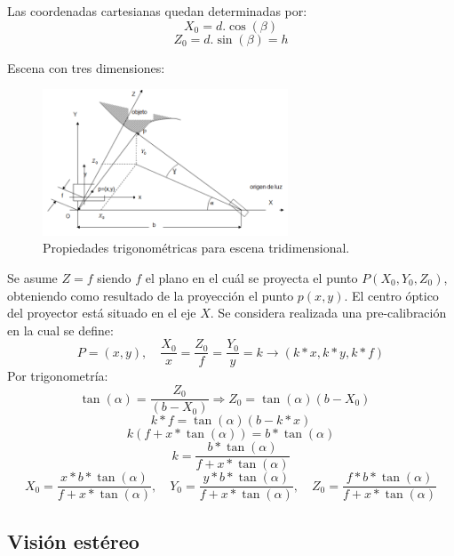 Las coordenadas cartesianas quedan determinadas por:
\[
X_0 = d. \cos (\beta)
\]
\[
Z_0 = d. \sin (\beta) = h
\]

Escena con tres dimensiones:

\begin{figure}[H]
  \centering
    \includegraphics[width=0.65\textwidth]{./Cap6_reconstruccion/triangulacion-2.PNG}
  \caption{Propiedades trigonométricas para escena tridimensional.}
  \label{fig:Triangulacion2}
\end{figure}

Se asume $Z = f$ siendo $f$ el plano en el cuál se proyecta el punto $P(X_0, Y_0, Z_0)$, obteniendo como resultado de la proyección el punto $p(x,y)$.
El centro óptico del proyector está situado en el eje $X$.
Se considera realizada una pre-calibración en la cual se define:
\[
P = (x,y), \quad \frac{X_0}{x} = \frac{Z_0}{f} = \frac{Y_0}{y} = k \to (k * x,k * y,k * f)
\]
Por trigonometría:
\[
\tan (\alpha) = \frac{Z_0}{(b - X_0)} \Rightarrow Z_0 = \tan (\alpha) (b - X_0) \quad 
\]
\[
k * f = \tan (\alpha)(b - k * x)
\]
\[
k (f + x * \tan (\alpha)) = b * \tan (\alpha)
\]
\[
k = \frac	{b * \tan (\alpha)}{f + x * \tan (\alpha)}
\]
\[
X_0 = \frac{x * b * \tan (\alpha)}{f + x * \tan (\alpha)}, \quad Y_0 = \frac{y * b * \tan (\alpha)}{f + x * \tan (\alpha)},\quad Z_0 = \frac{f * b * \tan (\alpha)}{f + x * \tan (\alpha)}
\]


\subsection{Visión estéreo}

